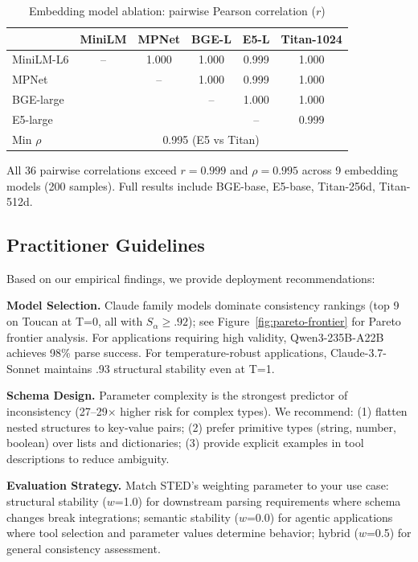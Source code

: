 \documentclass{article}
\theoremstyle{plain}
\theoremstyle{definition}
\begin{document}
\begin{table}[h]
\centering
\caption{Embedding model ablation: pairwise Pearson correlation ($r$)}
\label{tab:embedding-ablation}
\scriptsize
\begin{tabular}{@{}lccccc@{}}
\toprule
& \textbf{MiniLM} & \textbf{MPNet} & \textbf{BGE-L} & \textbf{E5-L} & \textbf{Titan-1024} \\
\midrule
MiniLM-L6 & -- & 1.000 & 1.000 & 0.999 & 1.000 \\
MPNet & & -- & 1.000 & 0.999 & 1.000 \\
BGE-large & & & -- & 1.000 & 1.000 \\
E5-large & & & & -- & 0.999 \\
\midrule
Min $\rho$ & \multicolumn{5}{c}{0.995 (E5 vs Titan)} \\
\bottomrule
\end{tabular}

\vspace{0.3em}
\raggedright\scriptsize All 36 pairwise correlations exceed $r=0.999$ and $\rho=0.995$ across 9 embedding models (200 samples). Full results include BGE-base, E5-base, Titan-256d, Titan-512d.
\end{table}

\subsection{Practitioner Guidelines}
\label{sec:practitioner-guidelines}

Based on our empirical findings, we provide deployment recommendations:

\textbf{Model Selection.} Claude family models dominate consistency rankings (top 9 on Toucan at T=0, all with $S_\alpha \geq .92$); see Figure~\ref{fig:pareto-frontier} for Pareto frontier analysis. For applications requiring high validity, Qwen3-235B-A22B achieves 98\% parse success. For temperature-robust applications, Claude-3.7-Sonnet maintains .93 structural stability even at T=1.

\textbf{Schema Design.} Parameter complexity is the strongest predictor of inconsistency (27--29$\times$ higher risk for complex types). We recommend: (1) flatten nested structures to key-value pairs; (2) prefer primitive types (string, number, boolean) over lists and dictionaries; (3) provide explicit examples in tool descriptions to reduce ambiguity.

\textbf{Evaluation Strategy.} Match STED's weighting parameter to your use case: structural stability ($w$=1.0) for downstream parsing requirements where schema changes break integrations; semantic stability ($w$=0.0) for agentic applications where tool selection and parameter values determine behavior; hybrid ($w$=0.5) for general consistency assessment.
\end{document}
